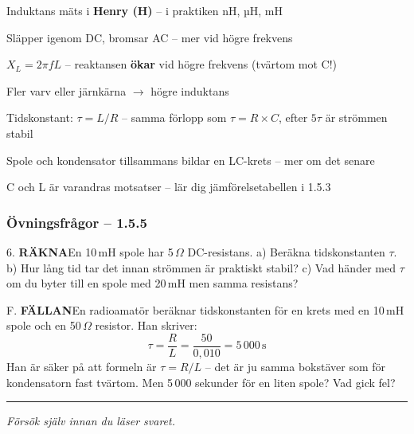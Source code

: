 \documentclass[a4paper,11pt,twoside]{book}
\newcommand{\emoji}[1]{{\emojifont #1}}
\newcommand{\qrakna}{\colorbox{bluepale}{\textcolor{bluedark}{\headingfont\bfseries\tiny RÄKNA}}}
\newcommand{\qfallan}{\colorbox{ljusbrun}{\textcolor{kakao}{\headingfont\bfseries\tiny FÄLLAN}}}
\begin{document}
\begin{orangebox}[title={\emoji{🎯} Viktigt för provet}]
\begin{checklist}
  \item Induktans mäts i \textbf{Henry (H)} -- i praktiken nH, µH, mH
  \item Släpper igenom DC, bromsar AC -- mer vid högre frekvens
  \item $X_L = 2\pi fL$ -- reaktansen \textbf{ökar} vid högre frekvens (tvärtom mot C!)
  \item Fler varv eller järnkärna $\rightarrow$ högre induktans
  \item Tidskonstant: $\tau = L/R$ -- samma förlopp som $\tau = R \times C$, efter $5\tau$ är strömmen stabil
  \item Spole och kondensator tillsammans bildar en LC-krets -- mer om det senare
  \item C och L är varandras motsatser -- lär dig jämförelsetabellen i 1.5.3
\end{checklist}
\end{orangebox}

\subsubsection*{Övningsfrågor -- 1.5.5}

\begin{qblock}{6.}
\qrakna\quad En 10\,mH spole har 5\,$\Omega$ 
DC-resistans. a) Beräkna tidskonstanten $\tau$. 
b) Hur lång tid tar det innan strömmen är praktiskt 
stabil? c) Vad händer med $\tau$ om du byter till en 
spole med 20\,mH men samma resistans?
\end{qblock}

\begin{qblock}{F.}
\qfallan\quad En radioamatör beräknar tidskonstanten för 
en krets med en 10\,mH spole och en 50\,$\Omega$ resistor. 
Han skriver:
\[
\tau = \frac{R}{L} = \frac{50}{0{,}010} = 5\,000\,\text{s}
\]
Han är säker på att formeln är $\tau = R/L$ -- det är 
ju samma bokstäver som för kondensatorn fast tvärtom. 
Men 5\,000 sekunder för en liten spole? Vad gick fel?
\end{qblock}

\medskip
\noindent\rule{\textwidth}{0.4pt}
{\small\itshape Försök själv innan du läser svaret.}
\medskip
\end{document}

